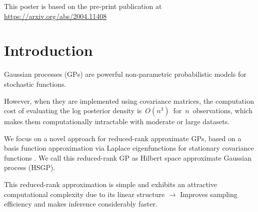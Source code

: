 \documentclass[portrait,a1,final]{a0poster} %
\let\tempone\itemize
\let\temptwo\enditemize
\renewenvironment{itemize}{\tempone\addtolength{\itemsep}{-0.3\baselineskip}}{\temptwo}
\begin{document}
\vspace{0.02\linewidth}

\centering

\sffamily
\footnotesize %


\begin{minipage}{1\linewidth} 
\centering
\begin{minipage}[t]{0.48\linewidth}
\vspace{0pt}
\setlength{\parindent}{10mm} %

\vspace{-0.5cm}
This poster is based on the pre-print publication at \url{https://arxiv.org/abs/2004.11408}

\vspace{-1cm}
\section{Introduction}
\vspace{-0.2cm}

\begin{itemize}
	\setlength{\itemsep}{3mm}
	\item Gaussian processes (GPs) are powerful non-parametric probabilistic models for stochastic functions.
	\item However, when they are implemented using covariance matrices, the computation cost of evaluating the log posterior density is\, $O(n^3)$\, for\, $n$\, observations, which makes them computationally intractable with moderate or large datasets.
	\item We focus on a novel approach for reduced-rank approximate GPs, based on a basis function approximation via Laplace eigenfunctions
for stationary covariance functions {\color{darkgray} \citep{solin2018hilbert}}. We call this reduced-rank GP as {\color{navyblue} Hilbert space approximate Gaussian process} (HSGP).
	\item This reduced-rank approximation is simple and exhibits an attractive computational complexity due to its linear structure\; $\to$\; Improves sampling efficiency and makes inference considerably faster.
	


\end{itemize}
\end{minipage}
\end{minipage}
\end{document}
